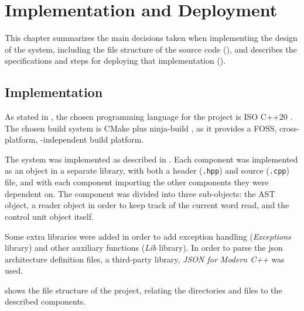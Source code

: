 \chapter{Implementation and Deployment}\label{chap:implementation}
This chapter summarizes the main decisions taken when implementing the design of the system, including the file structure of the source code (), and describes the specifications and steps for deploying that implementation ().


\section{Implementation}\label{sec:implementation}
As stated in , the chosen \gls{programming language} for the project is ISO C++20 \parencite{ISOcpp20}. The chosen \gls{build system} is CMake \parencite{cmake} plus ninja-build \parencite{ninja}, as it provides a \gls{FOSS}, cross-platform, -independent build platform.

The system was implemented as described in . Each component was implemented as an object in a separate library, with both a header (\texttt{.hpp}) and source (\texttt{.cpp}) file, and with each component importing the other components they were dependent on. The  component was divided into three sub-objects: the \gls{AST} object, a reader object in order to keep track of the current word read, and the control unit object itself.

Some extra libraries were added in order to add exception handling (\textit{Exceptions} library) and other auxiliary functions (\textit{Lib} library). In order to parse the \gls{json} architecture definition files, a third-party library, \textit{JSON for Modern C++} \parencite{nlohmann/json} was used.

 shows the file structure of the project, relating the directories and files to the described components.

